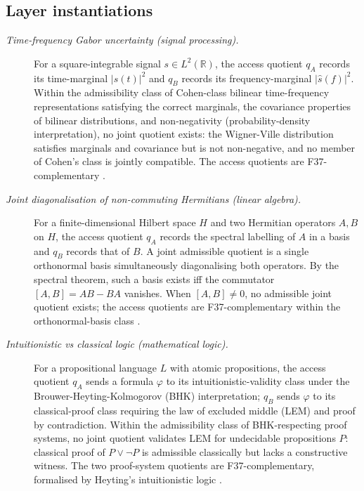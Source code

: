 \documentclass[11pt]{article}
\theoremstyle{definition}
\begin{document}
\subsection*{Layer instantiations}\label{layer-inst:F37}

\begin{description}
\item[\emph{Time-frequency Gabor uncertainty (signal
processing).}]
For a square-integrable signal \(s\in L^2(\mathbb R)\),
the access quotient \(q_A\) records its time-marginal
\(|s(t)|^2\) and \(q_B\) records its
frequency-marginal \(|\hat s(f)|^2\).  Within the
admissibility class of Cohen-class bilinear
time-frequency representations satisfying the correct
marginals, the covariance properties of bilinear
distributions, and non-negativity (probability-density
interpretation), no joint quotient exists: the
Wigner-Ville distribution satisfies marginals and
covariance but is not non-negative, and no member of
Cohen's class is jointly compatible.  The access
quotients are F37-complementary
\citep{Cohen1995TimeFrequency}.

\item[\emph{Joint diagonalisation of non-commuting
Hermitians (linear algebra).}]
For a finite-dimensional Hilbert space \(H\) and two
Hermitian operators \(A,B\) on \(H\), the access
quotient \(q_A\) records the spectral labelling of
\(A\) in a basis and \(q_B\) records that of \(B\).
A joint admissible quotient is a single orthonormal
basis simultaneously diagonalising both operators.
By the spectral theorem, such a basis exists iff the
commutator \([A,B]=AB-BA\) vanishes.  When
\([A,B]\ne 0\), no admissible joint quotient exists;
the access quotients are F37-complementary within
the orthonormal-basis class
\citep{Halmos1974FiniteDimensional}.

\item[\emph{Intuitionistic vs classical logic
(mathematical logic).}]
For a propositional language \(L\) with atomic
propositions, the access quotient \(q_A\) sends a
formula \(\varphi\) to its intuitionistic-validity
class under the Brouwer-Heyting-Kolmogorov (BHK)
interpretation; \(q_B\) sends \(\varphi\) to its
classical-proof class requiring the law of excluded
middle (LEM) and proof by contradiction.  Within the
admissibility class of BHK-respecting proof systems,
no joint quotient validates LEM for undecidable
propositions \(P\): classical proof of
\(P\vee\neg P\) is admissible classically but lacks
a constructive witness.  The two proof-system
quotients are F37-complementary, formalised by
Heyting's intuitionistic logic
\citep{Heyting1930Logik}.


\end{description}
\end{document}
